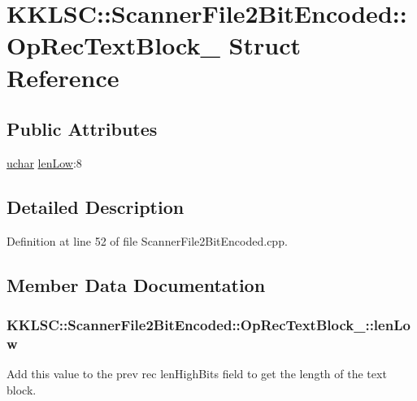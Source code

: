 \hypertarget{struct_scanner_file2_bit_encoded_1_1_op_rec_text_block__2}{}\section{K\+K\+L\+SC\+:\+:Scanner\+File2\+Bit\+Encoded\+:\+:Op\+Rec\+Text\+Block\+\_ Struct Reference}
\label{struct_scanner_file2_bit_encoded_1_1_op_rec_text_block__2}
\subsection*{Public Attributes}
\begin{DoxyCompactItemize}
\item 
\hyperlink{namespace_k_k_b_ace9969169bf514f9ee6185186949cdf7}{uchar} \hyperlink{struct_scanner_file2_bit_encoded_1_1_op_rec_text_block__2_abedb614c6b2b8ad2ff3e2ace167fe96e}{len\+Low}\+:8
\end{DoxyCompactItemize}


\subsection{Detailed Description}


Definition at line 52 of file Scanner\+File2\+Bit\+Encoded.\+cpp.



\subsection{Member Data Documentation}
\subsubsection[{\texorpdfstring{len\+Low}{lenLow}}]{ K\+K\+L\+S\+C\+::\+Scanner\+File2\+Bit\+Encoded\+::\+Op\+Rec\+Text\+Block\+\_\+::len\+Low}\hypertarget{struct_scanner_file2_bit_encoded_1_1_op_rec_text_block__2_abedb614c6b2b8ad2ff3e2ace167fe96e}{}\label{struct_scanner_file2_bit_encoded_1_1_op_rec_text_block__2_abedb614c6b2b8ad2ff3e2ace167fe96e}
Add this value to the prev rec \textquotesingle{}len\+High\+Bits\textquotesingle{} field to get the length of the text block. 

